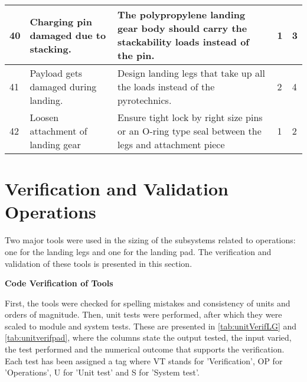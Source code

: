 \begin{table}[h]
\begin{scriptsize}
\begin{tabular}{|p{0.4cm}|p{3cm}|p{9.2cm}|p{0.4cm}|p{0.4cm}|}
40                                & Charging pin damaged due to stacking.                       & The polypropylene landing gear body should carry the stackability loads instead of the pin.                                                                                                & 1                                & 3                                \\ \hline
41                                & Payload gets damaged during landing.                        & Design landing legs that take up all the loads instead of the pyrotechnics.                                                                                                                & 2                                & 4                                \\ \hline
42                                & Loosen attachment of landing gear                       & Ensure tight lock by right size pins or an O-ring type seal between the legs and attachment piece                                                                                                                & 1                                & 2                                \\ \hline
\end{tabular}
\end{scriptsize}
\end{table}

\section{Verification and Validation Operations} \label{sec:opsverificationandvalidation}

Two major tools were used in the sizing of the subsystems related to operations: one for the landing legs and one for the landing pad. The verification and validation of these tools is presented in this section.

\textbf{Code Verification of Tools}

First, the tools were checked for spelling mistakes and consistency of units and orders of magnitude. Then, unit tests were performed, after which they were scaled to module and system tests. These are presented in \autoref{tab:unitVerifLG} and \autoref{tab:unitverifpad}, where the columns state the output tested, the input varied, the test performed and the numerical outcome that supports the verification. Each test has been assigned a tag where VT stands for 'Verification', OP for 'Operations', U for 'Unit test' and S for 'System test'.


